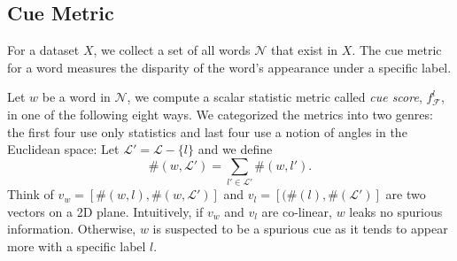 
\subsection{Cue Metric}

For a dataset $X$, we collect a set of all words $\mathcal{N}$ that exist
in $X$. 
The cue metric for a word measures the disparity of the word's appearance under 
 a specific label. 

Let $w$ be a word in $\mathcal{N}$, we compute a scalar statistic metric 
called {\em cue score}, $f_{\mathcal{F}}^l$,  in one of the following eight ways.
%
We categorized the metrics into two
genres: the first four use only statistics and last four use
a notion of angles in the Euclidean space:
Let $\mathcal{L'} = \mathcal{L} - \{l\}$ and we define 
\begin{equation}
    \#(w, \mathcal{L'}) = \sum_{l' \in \mathcal{L'}} \#(w, l').
\end{equation}
Think of $v_w=[\#(w, l), \#(w, \mathcal{L'})]$ and $v_l = [(\#(l), \#(\mathcal{L'})]$ are two vectors on a 2D plane. 
Intuitively, if $v_w$ and $v_l$ are co-linear, $w$ leaks no spurious information. 
Otherwise, $w$ is suspected to be a spurious cue as it tends to appear 
more with a specific label $l$.\\ 


